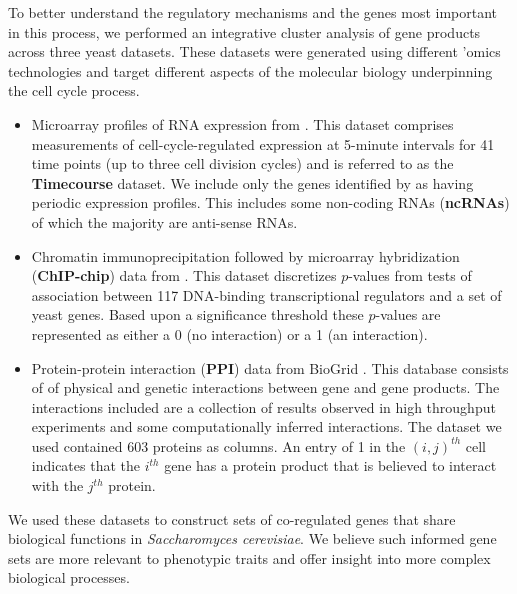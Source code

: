 \documentclass[]{article}
\begin{document}
To better understand the regulatory mechanisms and the genes most important in this process, we performed an integrative cluster analysis of gene products across three yeast datasets. These datasets were generated using different 'omics technologies and target different aspects of the molecular biology underpinning the cell cycle process.

\begin{itemize}
	\item Microarray profiles of RNA expression from \cite{granovskaia2010high}. This dataset comprises measurements of cell-cycle-regulated expression at 5-minute intervals for 41 time points (up to three cell division cycles) and is referred to as the \textbf{Timecourse} dataset. We include only the genes identified by \cite{granovskaia2010high} as having periodic expression profiles. This includes some non-coding RNAs (\textbf{ncRNAs}) of which the majority are anti-sense RNAs.
	\item Chromatin immunoprecipitation followed by microarray hybridization (\textbf{ChIP-chip}) data from \cite{harbison2004transcriptional}. This dataset discretizes $p$-values from tests of association between 117 DNA-binding transcriptional regulators and a set of yeast genes. Based upon a significance threshold these $p$-values are represented as either a 0 (no interaction) or a 1 (an interaction).
	\item Protein-protein interaction (\textbf{PPI}) data from BioGrid \citep{stark2006biogrid}. This database consists of of physical and genetic interactions between gene and gene products. The interactions included are a collection of results observed in high throughput experiments and some computationally inferred interactions. The dataset we used contained 603 proteins as columns. An entry of 1  in the $(i, j)^{th}$ cell indicates that the $i^{th}$ gene has a protein product that is believed to interact with the $j^{th}$ protein.
\end{itemize}
We used these datasets to construct sets of co-regulated genes that share biological functions in \emph{Saccharomyces cerevisiae}. We believe such informed gene sets are more relevant to phenotypic traits and offer insight into more complex biological processes. 
\end{document}
